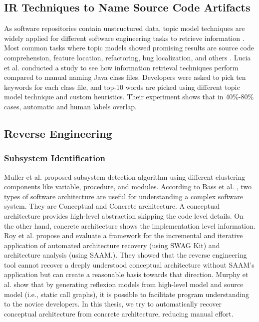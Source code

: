 \subsection{IR Techniques to Name Source Code Artifacts}
\label{related:IR}
As software repositories contain unstructured data, topic model techniques are widely applied for different software engineering tasks to retrieve information \cite{chen2016topicMiningRepositories, panichella2013topicModelsTasks, sun2016surveyTopicSE}. Most common tasks where topic models showed promising results are source code comprehension, feature location, refactoring, bug localization, and others \cite{sun2016surveyTopicSE}. Lucia et al. \cite{de2012IRMethodsArtifacts} conducted a study to see how information retrieval techniques perform compared to manual naming Java class files. Developers were asked to pick ten keywords for each class file, and top-10 words are picked using different topic model technique and custom heuristics. Their experiment shows that in 40\%-80\% cases, automatic and human labels overlap. 

\subsection{Reverse Engineering}
\label{related:reverse_engineering}
\subsubsection{Subsystem Identification}
Muller et al. \cite{muller1990composingSubsystemStructures} proposed subsystem detection algorithm using different clustering components like variable, procedure, and modules. 
According to Bass et al. \cite{bass2003softwareArchitecturePractice}, two types of software architecture are useful for understanding a complex software system. They are Conceptual and Concrete architecture. A conceptual architecture provides high-level abstraction skipping the code level details. On the other hand, concrete architecture shows the implementation level information. Roy et al. \cite{roy2008softwareArchitectureRecovery} propose and evaluate a framework for the incremental and iterative application of automated architecture recovery (using SWAG Kit) and architecture analysis (using SAAM.). They showed that the reverse engineering tool cannot recover a deeply understood conceptual architecture without SAAM's application but can create a reasonable basis towards that direction. Murphy et al.\cite{MurphyNotkin2001} show that by generating reflexion models from high-level model and source model (i.e., static call graphs), it is possible to facilitate program understanding to the novice developers. In this thesis, we try to automatically recover conceptual architecture from concrete architecture, reducing manual effort.

